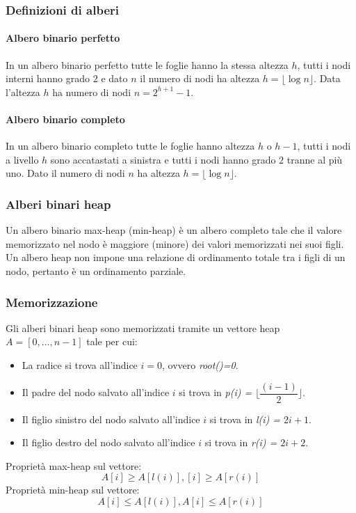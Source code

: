 \subsubsection{Definizioni di alberi}
\paragraph{Albero binario perfetto}
In un albero binario perfetto tutte le foglie hanno la stessa altezza $h$, tutti i nodi interni hanno grado $2$ e dato $n$ il numero di nodi ha altezza
$h=\lfloor \log n\rfloor$. Data l'altezza $h$ ha numero di nodi $n=2^{h+1}-1$.
\paragraph{Albero binario completo}
In un albero binario completo tutte le foglie hanno altezza $h$ o $h-1$, tutti i nodi a livello $h$ sono accatastati a sinistra e tutti i nodi hanno grado 
$2$ tranne al pi\`u uno. Dato il numero di nodi $n$ ha altezza $h=\lfloor \log n\rfloor$.
\subsubsection{Alberi binari heap}
Un albero binario max-heap (min-heap) \`e un albero completo tale che il valore memorizzato nel nodo \`e maggiore (minore) dei valori memorizzati nei suoi
figli. Un albero heap non impone una relazione di ordinamento totale tra i figli di un nodo, pertanto \`e un ordinamento parziale. 
\subsubsection{Memorizzazione}
Gli alberi binari heap sono memorizzati tramite un vettore heap $A=[0, \dots, n-1]$ tale per cui: 
\begin{itemize}
\item La radice si trova all'indice $i=0$, ovvero \emph{root()=0}.
\item Il padre del nodo salvato all'indice $i$ si trova in \emph{p(i) = $\biggl\lfloor\dfrac{(i-1)}{2} \biggr\rfloor$}.
\item Il figlio sinistro del nodo salvato all'indice $i$ si trova in \emph{l(i) = $2i+1$}.
\item Il figlio destro del nodo salvato all'indice $i$ si trova in \emph{r(i) = $2i+2$}.
\end{itemize}
Propriet\`a max-heap sul vettore: 
$$A[i]\ge A[l(i)], [i]\ge A[r(i)]$$ 
Propriet\`a min-heap sul vettore: 
$$A[i]\le A[l(i)], A[i]\le A[r(i)]$$
